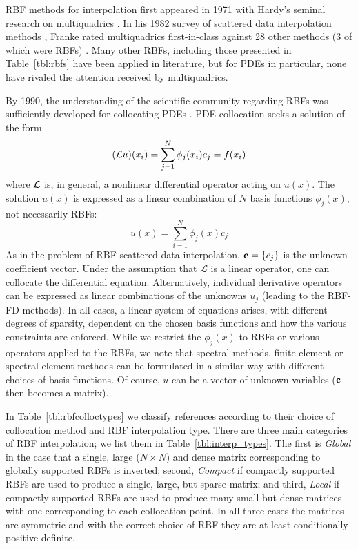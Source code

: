 \documentclass{report}
\begin{document}
{RBF methods for interpolation first appeared in 1971 with Hardy's seminal research on multiquadrics
\cite{Hardy1971}. In his 1982 survey of scattered data interpolation methods \cite{Franke1982}, Franke rated multiquadrics first-in-class against 28 other methods (3 of which were RBFs) \cite{Franke1982}. Many other RBFs, 
including those presented in Table~\ref{tbl:rbfs} have been applied in literature, but for PDEs in particular, none have rivaled the 
attention received by multiquadrics. 


By 1990, the understanding of the scientific community regarding RBFs was sufficiently developed for collocating PDEs \cite{Kansa1990a,Kansa1990b}. PDE collocation seeks a solution of the form
\begin{eqnarray*}
(\mathcal{L}u)(x_i) = \sum_{j=1}^{N} \phi_j(x_i) c_j = f(x_i)
\end{eqnarray*}
where $\mathcal{L}$ is, in general, a nonlinear differential operator acting on $u(x)$. The solution $u(x)$ is expressed as a linear combination of $N$ basis functions $\phi_j(x)$, not necessarily RBFs: 
$$
u(x) = \sum_{i=1}^N \phi_j(x) c_j 
$$
As in the problem of RBF scattered data interpolation, $ \mathbf{c} = \{c_j\} $ is the unknown coefficient vector. 
Under the assumption that $\mathcal{L}$ is a linear operator, one can collocate the differential equation. Alternatively, individual derivative operators can be expressed as linear combinations of the unknowns $u_j$ (leading to the RBF-FD methods). 
In all cases, a linear system of equations arises, with different degrees of sparsity, dependent on the chosen basis functions and how the various constraints are enforced.  While we restrict the $\phi_j(x)$ to RBFs or various operators applied to the RBFs, we note that spectral methods, finite-element or spectral-element methods can be formulated in a similar way with different choices of basis functions.  Of course, $u$ can be a vector of unknown variables ($\mathbf{c}$ then becomes a matrix). %


In Table~\ref{tbl:rbfcolloctypes} we classify references according to their choice of collocation method and RBF 
interpolation type. 
There are three main categories of RBF interpolation; we list them in Table~\ref{tbl:interp_types}. The first is \emph{Global} in the case that a single, large ($N\times N$) and 
dense matrix corresponding to globally supported RBFs is inverted; second, \emph{Compact} if compactly supported RBFs are used to 
produce a single, large, but sparse matrix; and third, \emph{Local} if compactly supported RBFs are used to produce many small but 
dense matrices with one corresponding to each collocation point. In all three cases the matrices are symmetric and with the correct choice of RBF they are at least conditionally positive definite. 

}
\end{document}
